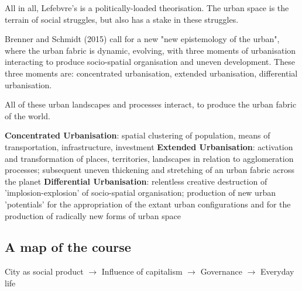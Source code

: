 \documentclass{article}
\begin{document}
All in all, Lefebvre's is a politically-loaded theorisation. The urban space is the terrain of social struggles, but also has a stake in these struggles.

Brenner and Schmidt (2015) call for a new "new epistemology of the urban", where the urban fabric is dynamic, evolving, with three moments of urbanisation interacting to produce socio-spatial organisation and uneven development. These three moments are: concentrated urbanisation, extended urbanisation, differential urbanisation.

All of these urban landscapes and processes interact, to produce the urban fabric of the world.

\begin{outline}
	\1 \textbf{Concentrated Urbanisation}: spatial clustering of population, means of transportation, infrastructure, investment
	\1 \textbf{Extended Urbanisation}: activation and transformation of places, territories, landscapes in relation to agglomeration processes; subsequent uneven thickening and stretching of an urban fabric across the planet
	\1 \textbf{Differential Urbanisation}: relentless creative destruction of 'implosion-explosion' of socio-spatial organisation; production of new urban 'potentials' for the appropriation of the extant urban configurations and for the production of radically new forms of urban space
\end{outline}

\subsection{A map of the course}

City as social product $\rightarrow$ Influence of capitalism $\rightarrow$ Governance $\rightarrow$ Everyday life
\end{document}
